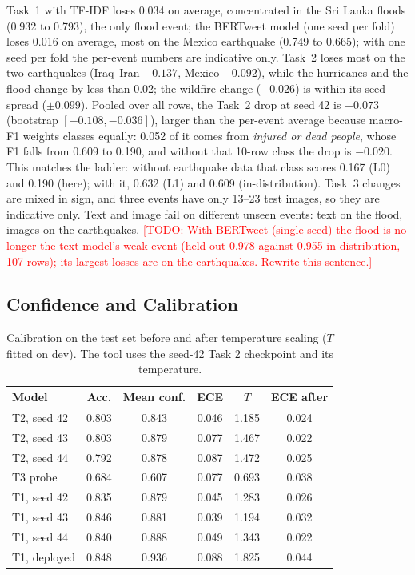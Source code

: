 \documentclass[conference]{IEEEtran}
\newcommand{\todo}[1]{\textcolor{red}{[TODO: #1]}}
\begin{document}
Task~1 with TF-IDF loses 0.034 on average, concentrated in the Sri Lanka floods (0.932 to 0.793), the only flood event; the BERTweet model (one seed per fold) loses 0.016 on average, most on the Mexico earthquake (0.749 to 0.665); with one seed per fold the per-event numbers are indicative only. Task~2 loses most on the two earthquakes (Iraq--Iran $-0.137$, Mexico $-0.092$), while the hurricanes and the flood change by less than 0.02; the wildfire change ($-0.026$) is within its seed spread ($\pm0.099$). Pooled over all rows, the Task~2 drop at seed 42 is $-0.073$ (bootstrap $[-0.108, -0.036]$), larger than the per-event average because macro-F1 weights classes equally: 0.052 of it comes from \emph{injured or dead people}, whose F1 falls from 0.609 to 0.190, and without that 10-row class the drop is $-0.020$. This matches the ladder: without earthquake data that class scores 0.167 (L0) and 0.190 (here); with it, 0.632 (L1) and 0.609 (in-distribution). Task~3 changes are mixed in sign, and three events have only 13--23 test images, so they are indicative only. Text and image fail on different unseen events: text on the flood, images on the earthquakes. \todo{With BERTweet (single seed) the flood is no longer the text model's weak event (held out 0.978 against 0.955 in distribution, 107 rows); its largest losses are on the earthquakes. Rewrite this sentence.}

\subsection{Confidence and Calibration}
\label{sec:calib}

\begin{table}[t]
\centering
\caption{Calibration on the test set before and after temperature scaling ($T$ fitted on dev). The tool uses the seed-42 Task 2 checkpoint and its temperature.}
\label{tab:calib}
\footnotesize
\setlength{\tabcolsep}{3.5pt}
\begin{tabular}{lccccc}
\toprule
Model & Acc. & Mean conf. & ECE & $T$ & ECE after \\
\midrule
T2, seed 42 & 0.803 & 0.843 & 0.046 & 1.185 & 0.024 \\
T2, seed 43 & 0.803 & 0.879 & 0.077 & 1.467 & 0.022 \\
T2, seed 44 & 0.792 & 0.878 & 0.087 & 1.472 & 0.025 \\
T3 probe & 0.684 & 0.607 & 0.077 & 0.693 & 0.038 \\
\midrule
T1, seed 42 & 0.835 & 0.879 & 0.045 & 1.283 & 0.026 \\
T1, seed 43 & 0.846 & 0.881 & 0.039 & 1.194 & 0.032 \\
T1, seed 44 & 0.840 & 0.888 & 0.049 & 1.343 & 0.022 \\
T1, deployed & 0.848 & 0.936 & 0.088 & 1.825 & 0.044 \\
\bottomrule
\end{tabular}
\end{table}
\end{document}

